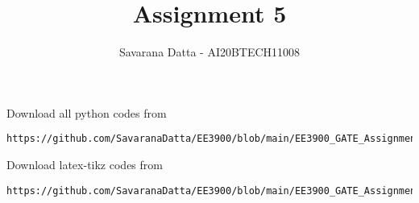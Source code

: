 \documentclass[journal,12pt,twocolumn]{IEEEtran}
\DeclareMathOperator*{\Res}{Res}
\begin{document}
\newcommand{\BEQA}{\begin{eqnarray}}
\newcommand{\EEQA}{\end{eqnarray}}
\newcommand{\define}{\stackrel{\triangle}{=}}

\raggedbottom
\setlength{\parindent}{0pt}
\providecommand{\mbf}{\mathbf}
\providecommand{\pr}[1]{\ensuremath{\Pr\left(#1\right)}}
\providecommand{\qfunc}[1]{\ensuremath{Q\left(#1\right)}}
\providecommand{\sbrak}[1]{\ensuremath{{}\left[#1\right]}}
\providecommand{\lsbrak}[1]{\ensuremath{{}\left[#1\right.}}
\providecommand{\rsbrak}[1]{\ensuremath{{}\left.#1\right]}}
\providecommand{\brak}[1]{\ensuremath{\left(#1\right)}}
\providecommand{\lbrak}[1]{\ensuremath{\left(#1\right.}}
\providecommand{\rbrak}[1]{\ensuremath{\left.#1\right)}}
\providecommand{\cbrak}[1]{\ensuremath{\left\{#1\right\}}}
\providecommand{\lcbrak}[1]{\ensuremath{\left\{#1\right.}}
\providecommand{\rcbrak}[1]{\ensuremath{\left.#1\right\}}}
\theoremstyle{remark}
\newtheorem{rem}{Remark}
\newcommand{\sgn}{\mathop{\mathrm{sgn}}}
\providecommand{\abs}[1]{\vert#1\vert}
\providecommand{\res}[1]{\Res\displaylimits_{#1}} 
\providecommand{\norm}[1]{\lVert#1\rVert}
\providecommand{\mtx}[1]{\mathbf{#1}}
\providecommand{\mean}[1]{E[ #1 ]}
\providecommand{\fourier}{\overset{\mathcal{F}}{ \rightleftharpoons}}
\providecommand{\system}{\overset{\mathcal{H}}{ \longleftrightarrow}}
\newcommand{\solution}{\noindent \textbf{Solution: }}
\newcommand{\cosec}{\,\text{cosec}\,}
\providecommand{\dec}[2]{\ensuremath{\overset{#1}{\underset{#2}{\gtrless}}}}
\newcommand{\myvec}[1]{\ensuremath{\begin{pmatrix}#1\end{pmatrix}}}
\newcommand{\mydet}[1]{\ensuremath{\begin{vmatrix}#1\end{vmatrix}}}
\makeatletter
{}
\makeatother
\let\StandardTheFigure\thefigure
\let\vec\mathbf
\renewcommand{\thefigure}{\theproblem}
\def\putbox#1#2#3{\makebox[0in][l]{\makebox[#1][l]{}\raisebox{\baselineskip}[0in][0in]{\raisebox{#2}[0in][0in]{#3}}}}
     \def\rightbox#1{\makebox[0in][r]{#1}}
     \def\centbox#1{\makebox[0in]{#1}}
     \def\topbox#1{\raisebox{-\baselineskip}[0in][0in]{#1}}
     \def\midbox#1{\raisebox{-0.5\baselineskip}[0in][0in]{#1}}
\vspace{3cm}
\title{Assignment 5}
\author{Savarana Datta - AI20BTECH11008}
\maketitle
\newpage
\bigskip
\renewcommand{\thefigure}{\theenumi}
\renewcommand{\thetable}{\theenumi}
Download all python codes from 
\begin{lstlisting}
https://github.com/SavaranaDatta/EE3900/blob/main/EE3900_GATE_Assignment2/codes
\end{lstlisting}
%
Download latex-tikz codes from 
%
\begin{lstlisting}
https://github.com/SavaranaDatta/EE3900/blob/main/EE3900_GATE_Assignment2/GATE_Assignment2.tex
\end{lstlisting}
\end{document}
